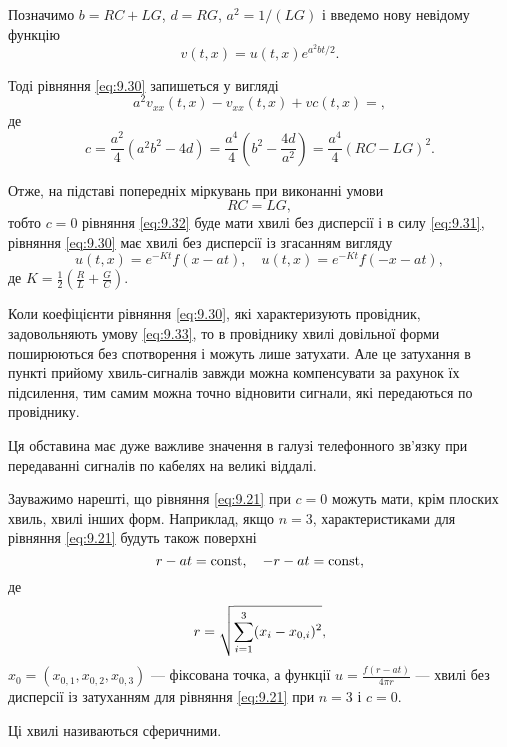 \begin{solution}
    Позначимо $b = RC + LG$, $d = RG$, $a^2 = 1 / (LG)$ і введемо нову невідому функцію
    \begin{equation}
        \label{eq:9.31}
        v(t,x) = u(t,x) e^{a^2bt/2}.
    \end{equation}
    
    Тоді рівняння \eqref{eq:9.30} запишеться у вигляді
    \begin{equation}
        \label{eq:9.32}
        a^2 v_{xx}(t,x)-v_{xx}(t,x)+vc(t,x)=,
    \end{equation}
    де
    \begin{equation}
        c = \frac{a^2}{4} (a^2b^2-4d) = \frac{a^4}{4}\left(b^2-\frac{4d}{a^2}\right) = \frac{a^4}{4}(RC-LG)^2.
    \end{equation}

    Отже, на підставі попередніх міркувань при виконанні умови 
    \begin{equation}
        \label{eq:9.33}
        RC = LG,
    \end{equation}
    тобто $c = 0$ рівняння \eqref{eq:9.32} буде мати хвилі без дисперсії і в силу \eqref{eq:9.31}, рівняння \eqref{eq:9.30} має хвилі без дисперсії із згасанням вигляду
    \begin{equation}
        u(t,x)=e^{-Kt}f(x-at), \quad u(t,x)=e^{-Kt}f(-x-at),
    \end{equation}
    де $K = \frac{1}{2} \left( \frac{R}{L} + \frac{G}{C} \right)$. \medskip

    Коли коефіцієнти рівняння \eqref{eq:9.30}, які характеризують провідник, задовольняють умову \eqref{eq:9.33}, то в провіднику хвилі довільної форми поширюються без спотворення і можуть лише затухати. Але це затухання в пункті прийому хвиль-сигналів завжди можна компенсувати за рахунок їх підсилення, тим самим можна точно відновити сигнали, які передаються по провіднику. \medskip

    Ця обставина має дуже важливе значення в галузі телефонного зв'язку при передаванні сигналів по кабелях на великі віддалі.
\end{solution}

Зауважимо нарешті, що рівняння \eqref{eq:9.21} при $c = 0$ можуть мати, крім плоских хвиль, хвилі інших форм. Наприклад, якщо $n = 3$, характеристиками для рівняння \eqref{eq:9.21} будуть також поверхні
\begin{equation}
    r - at = \operatorname{const}, \quad - r - a t = \operatorname{const},
\end{equation}
де 
\begin{equation}
    r = \sqrt{\displaystyle\sum\limits_{i=1}^3 (x_i - x_{0,i})^2},
\end{equation}
$x_0 = (x_{0, 1}, x_{0, 2}, x_{0, 3})$ --- фіксована точка, а функції $u = \frac{f(r - at)}{4 \pi r}$ --- хвилі без дисперсії із затуханням для рівняння \eqref{eq:9.21} при $n = 3$ і $c = 0$.

\begin{definition}
    Ці хвилі називаються сферичними.
\end{definition}


